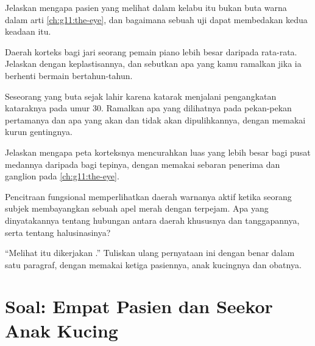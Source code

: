 \begin{exercise}[$\star\star$]\label{exo:g11:vision-and-brain:10}
Jelaskan mengapa pasien yang melihat dalam kelabu itu bukan buta warna
dalam arti \cref{ch:g11:the-eye}, dan bagaimana sebuah uji dapat
membedakan kedua keadaan itu.
\end{exercise}

\begin{exercise}[$\star\star$]\label{exo:g11:vision-and-brain:11}
Daerah korteks bagi jari seorang pemain piano lebih besar daripada
rata-rata. Jelaskan dengan keplastisannya, dan sebutkan apa yang kamu
ramalkan jika ia berhenti bermain bertahun-tahun.
\end{exercise}

\begin{exercise}[$\star\star\star$]\label{exo:g11:vision-and-brain:12}
Seseorang yang buta sejak lahir karena katarak menjalani pengangkatan
kataraknya pada umur 30. Ramalkan apa yang dilihatnya pada pekan-pekan
pertamanya dan apa yang akan dan tidak akan dipulihkannya, dengan
memakai kurun gentingnya.
\end{exercise}

\begin{exercise}[$\star\star\star$]\label{exo:g11:vision-and-brain:13}
Jelaskan mengapa peta korteksnya mencurahkan luas yang lebih besar bagi
pusat medannya daripada bagi tepinya, dengan memakai sebaran 
penerima dan  ganglion pada \cref{ch:g11:the-eye}.
\end{exercise}

\begin{exercise}[$\star\star\star$]\label{exo:g11:vision-and-brain:14}
Pencitraan fungsional memperlihatkan daerah warnanya aktif ketika
seorang subjek membayangkan sebuah apel merah dengan  terpejam. Apa
yang dinyatakannya tentang hubungan antara daerah khususnya dan
tanggapannya, serta tentang halusinasinya?
\end{exercise}

\begin{exercise}[$\star\star\star$]\label{exo:g11:vision-and-brain:15}
``Melihat itu dikerjakan .'' Tuliskan ulang pernyataan ini dengan
benar dalam satu paragraf, dengan memakai ketiga pasiennya, anak
kucingnya dan obatnya.
\end{exercise}

\section{Soal: Empat Pasien dan Seekor Anak Kucing}

